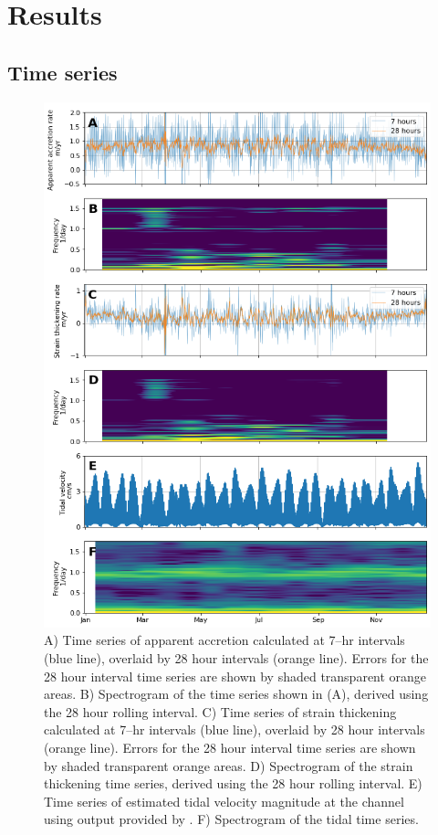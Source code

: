 \newpage

\section{Results } \label{sec:apres_results}

\subsection{Time series}

\begin{figure}[!ht]
\centering
\includegraphics[width=0.85
\textwidth]{chapters/3/alltimeseries.png}
\caption[Time series]{A) Time series of apparent accretion calculated at 7--hr intervals (blue line), overlaid by 28 hour intervals (orange line). Errors for the 28 hour interval time series are shown by shaded transparent orange areas. B) Spectrogram of the time series shown in (A), derived using the 28 hour rolling interval. C) Time series of strain thickening calculated at 7--hr intervals (blue line), overlaid by 28 hour intervals (orange line). Errors for the 28 hour interval time series are shown by shaded transparent orange areas. D)  Spectrogram of the strain thickening time series, derived using the 28 hour rolling interval. E) Time series of estimated tidal velocity magnitude at the channel using output provided by \cite{padman2002new}. F) Spectrogram of the tidal time series.
}
\label{fig:alltimeseries}
\end{figure}


